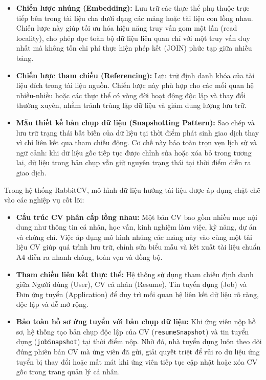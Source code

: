 \begin{itemize}
    \item \textbf{Chiến lược nhúng (Embedding):} Lưu trữ các thực thể phụ thuộc trực tiếp bên trong tài liệu cha dưới dạng các mảng hoặc tài liệu con lồng nhau. Chiến lược này giúp tối ưu hóa hiệu năng truy vấn gom một lần (read locality), cho phép đọc toàn bộ dữ liệu liên quan chỉ với một truy vấn duy nhất mà không tốn chi phí thực hiện phép kết (JOIN) phức tạp giữa nhiều bảng.
    \item \textbf{Chiến lược tham chiếu (Referencing):} Lưu trữ định danh khóa của tài liệu đích trong tài liệu nguồn. Chiến lược này phù hợp cho các mối quan hệ nhiều-nhiều hoặc các thực thể có vòng đời hoạt động độc lập và thay đổi thường xuyên, nhằm tránh trùng lặp dữ liệu và giảm dung lượng lưu trữ.
    \item \textbf{Mẫu thiết kế bản chụp dữ liệu (Snapshotting Pattern):} Sao chép và lưu trữ trạng thái bất biến của dữ liệu tại thời điểm phát sinh giao dịch thay vì chỉ liên kết qua tham chiếu động. Cơ chế này bảo toàn trọn vẹn lịch sử và ngữ cảnh: khi dữ liệu gốc tiếp tục được chỉnh sửa hoặc xóa bỏ trong tương lai, dữ liệu trong bản chụp vẫn giữ nguyên trạng thái tại thời điểm diễn ra giao dịch.
\end{itemize}

Trong hệ thống RabbitCV, mô hình dữ liệu hướng tài liệu được áp dụng chặt chẽ vào các nghiệp vụ cốt lõi:

\begin{itemize}
    \item \textbf{Cấu trúc CV phân cấp lồng nhau:} Một bản CV bao gồm nhiều mục nội dung như thông tin cá nhân, học vấn, kinh nghiệm làm việc, kỹ năng, dự án và chứng chỉ. Việc áp dụng mô hình nhúng các mảng này vào cùng một tài liệu CV giúp quá trình lưu trữ, chỉnh sửa biểu mẫu và kết xuất tài liệu chuẩn A4 diễn ra nhanh chóng, toàn vẹn và đồng bộ.
    \item \textbf{Tham chiếu liên kết thực thể:} Hệ thống sử dụng tham chiếu định danh giữa Người dùng (User), CV cá nhân (Resume), Tin tuyển dụng (Job) và Đơn ứng tuyển (Application) để duy trì mối quan hệ liên kết dữ liệu rõ ràng, độc lập và dễ mở rộng.
    \item \textbf{Bảo toàn hồ sơ ứng tuyển với bản chụp dữ liệu:} Khi ứng viên nộp hồ sơ, hệ thống tạo bản chụp độc lập của CV (\texttt{resumeSnapshot}) và tin tuyển dụng (\texttt{jobSnapshot}) tại thời điểm nộp. Nhờ đó, nhà tuyển dụng luôn theo dõi đúng phiên bản CV mà ứng viên đã gửi, giải quyết triệt để rủi ro dữ liệu ứng tuyển bị thay đổi hoặc mất mát khi ứng viên tiếp tục cập nhật hoặc xóa CV gốc trong trang quản lý cá nhân.
\end{itemize}

